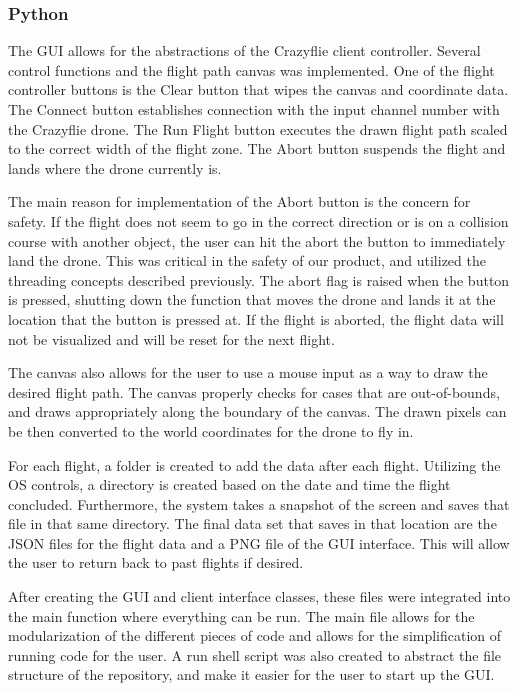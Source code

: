 \documentclass[conf]{new-aiaa}
\begin{document}
        \subsubsection{Python}
            The GUI allows for the abstractions of the Crazyflie client controller. Several control functions and the flight path canvas was implemented. One of the flight controller buttons is the Clear button that wipes the canvas and coordinate data. The Connect button establishes connection with the input channel number with the Crazyflie drone. The Run Flight button executes the drawn flight path scaled to the correct width of the flight zone. The Abort button suspends the flight and lands where the drone currently is. 
            
            The main reason for implementation of the Abort button is the concern for safety. If the flight does not seem to go in the correct direction or is on a collision course with another object, the user can hit the abort the button to immediately land the drone. This was critical in the safety of our product, and utilized the threading concepts described previously. The abort flag is raised when the button is pressed, shutting down the function that moves the drone and lands it at the location that the button is pressed at. If the flight is aborted, the flight data will not be visualized and will be reset for the next flight.
            
            The canvas also allows for the user to use a mouse input as a way to draw the desired flight path. The canvas properly checks for cases that are out-of-bounds, and draws appropriately along the boundary of the canvas. The drawn pixels can be then converted to the world coordinates for the drone to fly in. 
            
            
            For each flight, a folder is created to add the data after each flight. Utilizing the OS controls, a directory is created based on the date and time the flight concluded. Furthermore, the system takes a snapshot of the screen and saves that file in that same directory. The final data set that saves in that location are the JSON files for the flight data and a PNG file of the GUI interface. This will allow the user to return back to past flights if desired. 
            
            After creating the GUI and client interface classes, these files were integrated into the main function where everything can be run. The main file allows for the modularization of the different pieces of code and allows for the simplification of running code for the user. A run shell script was also created to abstract the file structure of the repository, and make it easier for the user to start up the GUI. 
        
\end{document}
